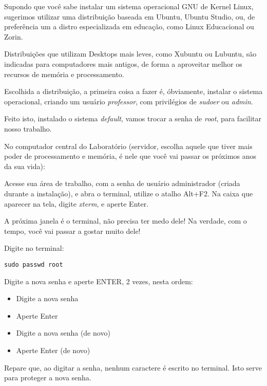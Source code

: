 
 
\begin{multicols}{2}
\normalsize
	
Supondo que você sabe instalar um sistema operacional GNU de Kernel Linux, sugerimos utilizar uma distribuição baseada em Ubuntu, Ubuntu Studio,  ou, de preferência um a distro especializada em educação, como Linux Educacional ou Zorin.

Distribuições que utilizam Desktops mais leves, como Xubuntu ou Lubuntu, são indicadas para computadores mais antigos, de forma a aproveitar melhor os recursos de memória e processamento.

Escolhida a distribuição, a primeira coisa a fazer é, óbviamente, instalar o sistema operacional, criando um usuário \textit{professor}, com privilégios de \textit{sudoer} ou \textit{admin}.

Feito isto, instalado o sistema \textit{default}, vamos trocar a senha de \textit{root}, para facilitar nosso trabalho.

No computador central do Laboratório (servidor, escolha aquele que tiver mais poder de processamento e memória, é nele que você vai passar os próximos anos da sua vida):

Acesse sua área de trabalho, com a senha de usuário administrador (criada durante a instalação), e abra o terminal, utilize o atalho Alt+F2. Na caixa que aparecer na tela, digite \textit{xterm}, e aperte Enter.

A próxima janela é o terminal, não precisa ter medo dele! Na verdade, com o tempo, você vai passar a gostar muito dele!

Digite no terminal:

\begin{lstlisting}
sudo passwd root
\end{lstlisting}

Digite a nova senha e aperte ENTER, 2 vezes, nesta ordem:

\begin{itemize}
	\item Digite a nova senha
	\item Aperte Enter
\item Digite a nova senha (de novo)
\item Aperte Enter (de novo)
\end{itemize}

Repare que, ao digitar a senha, nenhum caractere é escrito no terminal. Isto serve para proteger a nova senha.


\end{multicols}
